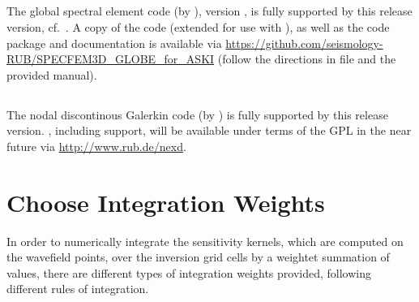 \subsection*{}
The global spectral element code  (by \cite{TrKoLi08}), 
version , is fully supported by this \ASKI{} release version, cf.~\cite{Specfem3D_Globe_for_ASKI}.
A copy of the code (extended for use with \ASKI{}), as well as the code package 
and documentation is available via \url{https://github.com/seismology-RUB/SPECFEM3D_GLOBE_for_ASKI}
(follow the directions in file  and the provided manual).
\subsection*{}
The nodal discontinous Galerkin code  (by \cite{Lambrecht.2015}) is fully supported by this 
\ASKI{} release version. , including \ASKI{} support, will be available 
under terms of the GPL in the near future via \url{http://www.rub.de/nexd}.
%
\section{Choose Integration Weights} \label{basic_steps,sec:intw}
%
In order to numerically integrate the sensitivity kernels, which are computed on the wavefield points, 
over the inversion grid cells by a weightet summation of values, there are different 
types of integration weights provided, following different rules of integration.

